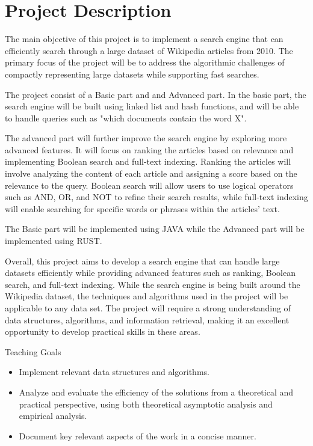 \section{Project Description}
The main objective of this project is to implement a search engine that can efficiently search through a large dataset of Wikipedia articles from 2010. The primary focus of the project will be to address the algorithmic challenges of compactly representing large datasets while supporting fast searches.

The project consist of a Basic part and and Advanced part. In the basic part, the search engine will be built using linked list and hash functions, and will be able to handle queries such as "which documents contain the word X". 

The advanced part will further improve the search engine by exploring more advanced features. It will focus on ranking the articles based on relevance and implementing Boolean search and full-text indexing. Ranking the articles will involve analyzing the content of each article and assigning a score based on the relevance to the query. Boolean search will allow users to use logical operators such as AND, OR, and NOT to refine their search results, while full-text indexing will enable searching for specific words or phrases within the articles' text.

The Basic part will be implemented using JAVA while the Advanced part will be implemented using RUST.

Overall, this project aims to develop a search engine that can handle large datasets efficiently while providing advanced features such as ranking, Boolean search, and full-text indexing. While the search engine is being built around the Wikipedia dataset, the techniques and algorithms used in the project will be applicable to any data set. The project will require a strong understanding of data structures, algorithms, and information retrieval, making it an excellent opportunity to develop practical skills in these areas.

 

Teaching Goals
\begin{itemize}
    \item Implement relevant data structures and algorithms. 
    \item Analyze and evaluate the efficiency of the solutions from a theoretical and practical perspective, using both theoretical asymptotic analysis and empirical analysis.
    \item Document key relevant aspects of the work in a concise manner. 
\end{itemize}

